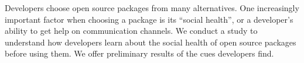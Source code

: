 Developers choose open source packages from many alternatives.
One increasingly important factor when choosing a package is its ``social health'', or a developer's ability to get help on communication channels.
We conduct a study to understand how developers learn about the social health of open source packages before using them.
We offer preliminary results of the cues developers find.

